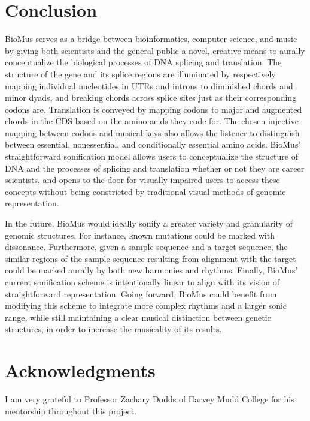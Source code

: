 \documentclass[letterpaper]{article}
\begin{document}
\section{Conclusion}
BioMus serves as a bridge between bioinformatics, computer science, and music by giving both scientists and the general public a novel, creative means to aurally conceptualize the biological processes of DNA splicing and translation. The structure of the gene and its splice regions are illuminated by respectively mapping individual nucleotides in UTRs and introns to diminished chords and minor dyads, and breaking chords across splice sites just as their corresponding codons are. Translation is conveyed by mapping codons to major and augmented chords in the CDS based on the amino acids they code for. The chosen injective mapping between codons and musical keys also allows the listener to distinguish between essential, nonessential, and conditionally essential amino acids. BioMus' straightforward sonification model allows users to conceptualize the structure of DNA and the processes of splicing and translation whether or not they are career scientists, and opens to the door for visually impaired users to access these concepts without being constricted by traditional visual methods of genomic representation. 

In the future, BioMus would ideally sonify a greater variety and granularity of genomic structures. For instance, known mutations could be marked with dissonance. Furthermore, given a sample sequence and a target sequence, the similar regions of the sample sequence resulting from alignment with the target could be marked aurally by both new harmonies and rhythms. Finally, BioMus' current sonification scheme is intentionally linear to align with its vision of straightforward representation. Going forward, BioMus could benefit from modifying this scheme to integrate more complex rhythms and a larger sonic range, while still maintaining a clear musical distinction between genetic structures, in order to increase the musicality of its results.


\section{Acknowledgments}

I am very grateful to Professor Zachary Dodds of Harvey Mudd College for his mentorship throughout this project.




\end{document}

